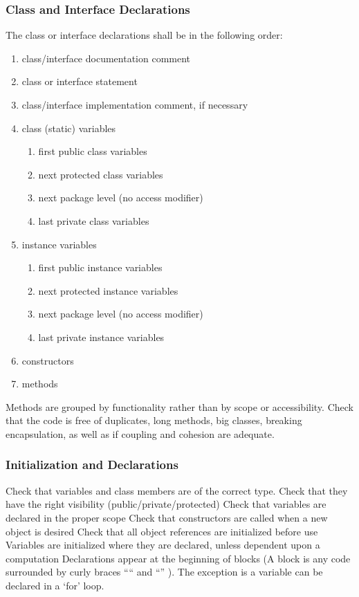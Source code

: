 \subsubsection{Class and Interface Declarations}
\begin{itemize}
		The class or interface declarations shall be in the following order:
		\begin{enumerate}
			\item
				class/interface documentation comment
			\item
				class or interface statement
			\item
				class/interface implementation comment, if necessary
			\item
				class (static) variables
				\begin{enumerate}
					\item first public class variables
					\item next protected class variables
					\item next package level (no access modifier)
					\item last private class variables
				\end{enumerate}
			\item
				instance variables
				\begin{enumerate}
					\item first public instance variables
					\item next protected instance variables
					\item next package level (no access modifier)
					\item last private instance variables
				\end{enumerate}
			\item
				constructors
			\item
				methods
		\end{enumerate}
		Methods are grouped by functionality rather than by scope or accessibility.
		Check that the code is free of duplicates, long methods, big classes, breaking encapsulation, as well as if coupling and cohesion are adequate.
\end{itemize}

\subsubsection{Initialization and Declarations}
\begin{itemize}
		Check that variables and class members are of the correct type. Check that they have the right visibility (public/private/protected)
		Check that variables are declared in the proper scope
		Check that constructors are called when a new object is desired
		Check that all object references are initialized before use
		Variables are initialized where they are declared, unless dependent upon a computation
		Declarations appear at the beginning of blocks (A block is any code surrounded by curly braces “{“ and “}” ). The exception is a variable can be declared in a ‘for’ loop.
\end{itemize}

